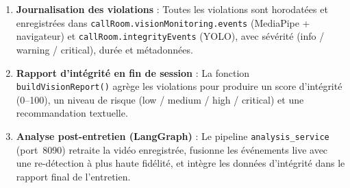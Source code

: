 \begin{enumerate}
\item \textbf{Journalisation des violations} : Toutes les violations sont horodatées
      et enregistrées dans \texttt{callRoom.visionMonitoring.events} (MediaPipe +
      navigateur) et \texttt{callRoom.integrityEvents} (YOLO), avec sévérité
      (info / warning / critical), durée et métadonnées.

\item \textbf{Rapport d'intégrité en fin de session} : La fonction
      \texttt{buildVisionReport()} agrège les violations pour produire un score
      d'intégrité (0–100), un niveau de risque (low / medium / high / critical) et
      une recommandation textuelle.

\item \textbf{Analyse post-entretien (LangGraph)} : Le pipeline \texttt{analysis\_service}
      (port~8090) retraite la vidéo enregistrée, fusionne les événements live avec
      une re-détection à plus haute fidélité, et intègre les données d'intégrité dans
      le rapport final de l'entretien.
\end{enumerate}

